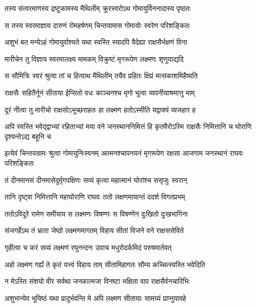 \twolineshloka
{तस्य संत्वरमाणस्य द्रष्टुकामस्य मैथिलीम्}
{क्रूरस्वरोऽथ गोमायुर्विननादास्य पृष्ठतः} %

\twolineshloka
{स तस्य स्वरमाज्ञाय दारुणं रोमहर्षणम्}
{चिन्तयामास गोमायोः स्वरेण परिशङ्कितः} %

\twolineshloka
{अशुभं बत मन्येऽहं गोमायुर्वाश्यते यथा}
{स्वस्ति स्यादपि वैदेह्या राक्षसैर्भक्षणं विना} %

\twolineshloka
{मारीचेन तु विज्ञाय स्वरमालक्ष्य मामकम्}
{विक्रुष्टं मृगरूपेण लक्ष्मणः शृणुयाद्यदि} %

\twolineshloka
{स सौमित्रिः स्वरं श्रुत्वा तां च हित्वाथ मैथिलीम्}
{तयैव प्रहितः क्षिप्रं मत्सकाशमिहैष्यति} %

\twolineshloka
{राक्षसैः सहितैर्नूनं सीताया ईप्सितो वधः}
{काञ्चनश्च मृगो भूत्वा व्यपनीयाश्रमात्तु माम्} %

\twolineshloka
{दूरं नीत्वा तु मारीचो राक्षसोऽभूच्छराहतः}
{हा लक्ष्मण हतोऽस्मीति यद्वाक्यं व्यजहार ह} %

\threelineshloka
{अपि स्वस्ति भवेद्द्वाभ्यां रहिताभ्यां मया वने}
{जनस्थाननिमित्तं हि कृतवैरोऽस्मि राक्षसैः}
{निमित्तानि च घोराणि दृश्यन्तेऽद्य बहूनि च} %

\threelineshloka
{इत्येवं चिन्तयन्रामः श्रुत्वा गोमायुनिःस्वनम्}
{आत्मनश्चापनयनं मृगरूपेण रक्षसा}
{आजगाम जनस्थानं राघवः परिशङ्कितः} %

\twolineshloka
{तं दीनमानसं दीनमासेदुर्मृगपक्षिणः}
{सव्यं कृत्वा महात्मानं घोरांश्च ससृजुः स्वरान्} %

\twolineshloka
{तानि दृष्ट्वा निमित्तानि महाघोराणि राघवः}
{ततो लक्षणमायान्तं ददर्श विगतप्रभम्} %

\twolineshloka
{ततोऽविदूरे रामेण समीयाय स लक्ष्मणः}
{विषण्णः स विषण्णेन दुःखितो दुःखभागिना} %

\twolineshloka
{संजगर्हेऽथ तं भ्राता जेष्ठो लक्ष्मणमागतम्}
{विहाय सीतां विजने वने राक्षससेविते} %

\twolineshloka
{गृहीत्वा च करं सव्यं लक्ष्मणं रघुनन्दनः}
{उवाच मधुरोदर्कमिदं परुषमार्तवत्} %

\twolineshloka
{अहो लक्ष्मण गर्ह्यं ते कृतं यत्त्वं विहाय ताम्}
{सीतामिहागतः सौम्य कच्चित्स्वस्ति भवेदिति} %

\twolineshloka
{न मेऽस्ति संशयो वीर सर्वथा जनकात्मजा}
{विनष्टा भक्षिता वाप राक्षसैर्वनचारिभिः} %

\twolineshloka
{अशुभान्येव भूयिष्ठं यथा प्रादुर्भवन्ति मे}
{अपि लक्ष्मण सीतायाः सामग्र्यं प्राप्नुयावहे} %

